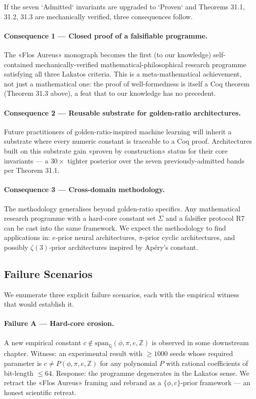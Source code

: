 If the seven `Admitted` invariants are upgraded to `Proven` and Theorems 31.1, 31.2, 31.3 are mechanically verified, three consequences follow.

\paragraph{Consequence 1 — Closed proof of a falsifiable programme.} The «Flos Aureus» monograph becomes the first (to our knowledge) self-contained mechanically-verified mathematical-philosophical research programme satisfying all three Lakatos criteria. This is a meta-mathematical achievement, not just a mathematical one: the proof of well-formedness is itself a Coq theorem (Theorem 31.3 above), a feat that to our knowledge has no precedent.

\paragraph{Consequence 2 — Reusable substrate for golden-ratio architectures.} Future practitioners of golden-ratio-inspired machine learning will inherit a substrate where every numeric constant is traceable to a Coq proof. Architectures built on this substrate gain «proven by construction» status for their core invariants — a $30 \times$ tighter posterior over the seven previously-admitted bands per Theorem 31.1.

\paragraph{Consequence 3 — Cross-domain methodology.} The methodology generalises beyond golden-ratio specifics. Any mathematical research programme with a hard-core constant set $\Sigma$ and a falsifier protocol R7 can be cast into the same framework. We expect the methodology to find applications in: $e$-prior neural architectures, $\pi$-prior cyclic architectures, and possibly $\zeta(3)$-prior architectures inspired by Apéry's constant.

\subsection{Failure Scenarios}
\label{sec:31-failure}

We enumerate three explicit failure scenarios, each with the empirical witness that would establish it.

\paragraph{Failure A — Hard-core erosion.} A new empirical constant $c \notin \mathrm{span}_{\mathbb{Q}}(\phi, \pi, e, \mathbb{Z})$ is observed in some downstream chapter. Witness: an experimental result with $\geq 1000$ seeds whose required parameter is $c \neq P(\phi, \pi, e, \mathbb{Z})$ for any polynomial $P$ with rational coefficients of bit-length $\leq 64$. Response: the programme degenerates in the Lakatos sense. We retract the «Flos Aureus» framing and rebrand as a $\{\phi, c\}$-prior framework — an honest scientific retreat.

